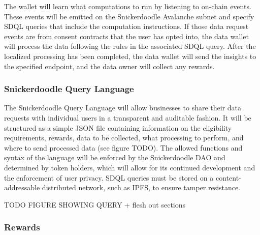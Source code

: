 The wallet will learn what computations to run by listening to on-chain events. These events will be emitted on the Snickerdoodle Avalanche 
subnet and specify SDQL queries that include the computation instructions. If those data request events are from consent contracts that the 
user has opted into, the data wallet will process the data following the rules in the associated SDQL query. After the localized processing 
has been completed, the data wallet will send the insights to the specified endpoint, and the data owner will collect any rewards.


\subsubsection{Snickerdoodle Query Language} %
\label{section:SDQL}
The Snickerdoodle Query Language will allow businesses to share their data requests with individual users in a transparent and auditable fashion. 
It will be structured as a simple JSON file containing information on the eligibility requirements, rewards, data to be collected, what processing 
to perform, and where to send processed data (see figure TODO). The allowed functions and syntax of the language will be enforced by the 
Snickerdoodle DAO and determined by token holders, which will allow for its continued development and the enforcement of user privacy. SDQL 
queries must be stored on a content-addressable distributed network, such as IPFS, to ensure tamper resistance. 

TODO FIGURE SHOWING QUERY + flesh out sections


\subsubsection{Rewards}

